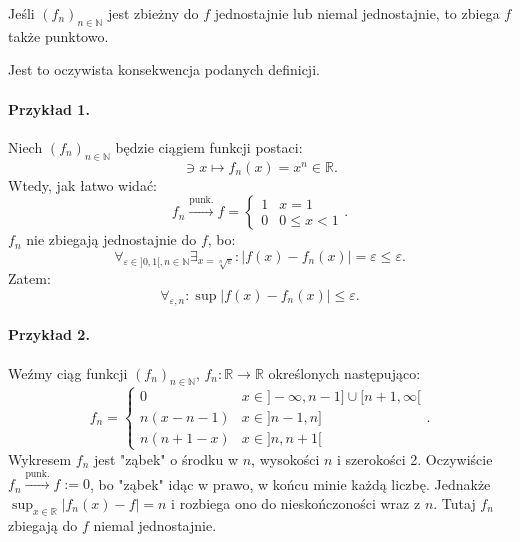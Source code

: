 \documentclass{article}
\newcounter{defi}
\numberwithin{defi}{section}
\numberwithin{defi}{section}
\newcommand{\R}{\mathbb{R}}
\newcommand{\N}{\mathbb{N}}
\newcommand{\oo}{\infty}
\providecommand{\eps}{\varepsilon}
\renewcommand{\leq}{\leqslant}
\newcommand{\ciag}[1]{(#1_{n})_{n \in \N}}
\newcommand{\topunk}{\xrightarrow{\text{punk.}}}
\begin{document}
\begin{obs}{}
    Jeśli $\ciag{f}$ jest zbieżny do $f$ jednostajnie lub niemal jednostajnie, to zbiega $f$ także punktowo.
\end{obs}

Jest to oczywista konsekwencja podanych definicji.

\paragraph{Przykład 1.} Niech $\ciag{f}$ będzie ciągiem funkcji postaci: \begin{equation}
    [0, 1] \ni x \mapsto f_n(x) = x^n \in \R.
\end{equation} Wtedy, jak łatwo widać: \begin{equation}
    f_n \topunk f = \begin{cases}
        1 & x = 1 \\
        0 & 0 \leq x < 1
    \end{cases}.
\end{equation}
$f_n$ nie zbiegają jednostajnie do $f$, bo: \begin{equation}
    \forall_{\eps \in ]0, 1[, n \in \N} \exists_{x = \sqrt[n]{\eps}}: |f(x) - f_n(x)| = \eps \leq \eps.
\end{equation}
Zatem: \begin{equation}
    \forall_{\eps, n}: \sup| f(x) - f_n(x)| \leq \eps.
\end{equation}

\paragraph{Przykład 2.} Weźmy ciąg funkcji $\ciag{f}$, $f_n: \R \to \R$ określonych następująco: 
\begin{equation}
    f_n  = \begin{cases}
        0 & x \in ]-\oo, n-1] \cup [n+1, \oo[ \\
        n(x - n - 1) & x \in ]n-1, n] \\
        n(n+1 - x) & x \in ]n, n+1[
    \end{cases}.
\end{equation}
Wykresem $f_n$ jest "ząbek" o środku w $n$, wysokości $n$ i szerokości 2. Oczywiście $f_n \topunk f := 0$, bo "ząbek" idąc w prawo, w końcu minie każdą liczbę. Jednakże $\sup_{x \in \R} |f_n(x) - f| = n$ i rozbiega ono do nieskończoności wraz z $n$. Tutaj $f_n$ zbiegają do $f$ niemal jednostajnie.
\end{document}
